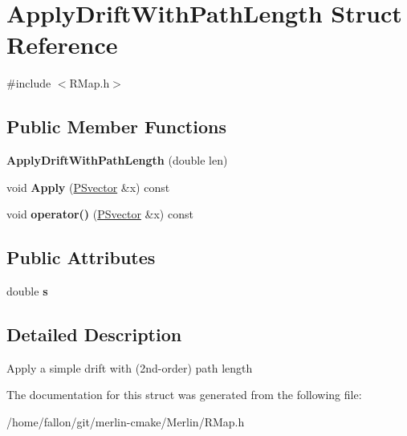 \hypertarget{structApplyDriftWithPathLength}{}\section{Apply\+Drift\+With\+Path\+Length Struct Reference}
\label{structApplyDriftWithPathLength}


{\ttfamily \#include $<$R\+Map.\+h$>$}

\subsection*{Public Member Functions}
\begin{DoxyCompactItemize}
\item 
\mbox{\label{structApplyDriftWithPathLength_ad80d616f299e65ac79280c70a1f8276c}} 
{\bfseries Apply\+Drift\+With\+Path\+Length} (double len)
\item 
\mbox{\label{structApplyDriftWithPathLength_a98794d4b2287603b32f7ff187e22fdbd}} 
void {\bfseries Apply} (\hyperlink{classPSvector}{P\+Svector} \&x) const
\item 
\mbox{\label{structApplyDriftWithPathLength_a980edf5898779c059e29ee3c25c269f9}} 
void {\bfseries operator()} (\hyperlink{classPSvector}{P\+Svector} \&x) const
\end{DoxyCompactItemize}
\subsection*{Public Attributes}
\begin{DoxyCompactItemize}
\item 
\mbox{\label{structApplyDriftWithPathLength_a3d9881e37469f0e554959b0f700b3609}} 
double {\bfseries s}
\end{DoxyCompactItemize}


\subsection{Detailed Description}
Apply a simple drift with (2nd-\/order) path length 

The documentation for this struct was generated from the following file\+:\begin{DoxyCompactItemize}
\item 
/home/fallon/git/merlin-\/cmake/\+Merlin/R\+Map.\+h\end{DoxyCompactItemize}
